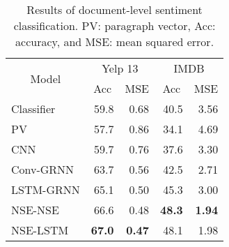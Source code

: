 \documentclass{article}
\begin{document}
\begin{table}[tp]
\begin{center}
\small
\begin{tabular}{c|c|c|c|c}
\hline
\multirow{2}{*}{Model} & \multicolumn{2}{|c|}{Yelp 13} & \multicolumn{2}{|c}{IMDB} \\
\hhline{~----} & Acc & MSE & Acc & MSE\\
\hline

\multicolumn{1}{l|}{Classifier \cite{tang:15}} & \multicolumn{1}{|r|}{59.8} & \multicolumn{1}{|r|}{0.68} & \multicolumn{1}{|r|}{40.5} & \multicolumn{1}{|r}{3.56} \\

\hline

\multicolumn{1}{l|}{PV \cite{tang:15}} & \multicolumn{1}{|r|}{57.7} & \multicolumn{1}{|r|}{0.86} & \multicolumn{1}{|r|}{34.1} & \multicolumn{1}{|r}{4.69} \\
\multicolumn{1}{l|}{CNN \cite{tang:15}} & \multicolumn{1}{|r|}{59.7} & \multicolumn{1}{|r|}{0.76} & \multicolumn{1}{|r|}{37.6} & \multicolumn{1}{|r}{3.30} \\
\multicolumn{1}{l|}{Conv-GRNN \cite{tang:15}} & \multicolumn{1}{|r|}{63.7} & \multicolumn{1}{|r|}{0.56} & \multicolumn{1}{|r|}{42.5} & \multicolumn{1}{|r}{2.71} \\
\multicolumn{1}{l|}{LSTM-GRNN \cite{tang:15}} & \multicolumn{1}{|r|}{65.1} & \multicolumn{1}{|r|}{0.50} & \multicolumn{1}{|r|}{45.3} & \multicolumn{1}{|r}{3.00} \\
\multicolumn{1}{l|}{NSE-NSE} & \multicolumn{1}{|r|}{66.6} & \multicolumn{1}{|r|}{0.48} & \multicolumn{1}{|r|}{\bf 48.3} & \multicolumn{1}{|r}{\textbf{\bf 1.94}} \\
\multicolumn{1}{l|}{NSE-LSTM} & \multicolumn{1}{|r|}{\bf 67.0} & \multicolumn{1}{|r|}{\bf 0.47} & \multicolumn{1}{|r|}{48.1} & \multicolumn{1}{|r}{1.98} \\

\hline
\end{tabular} 
\end{center}
\caption{\label{table:doc}Results of document-level sentiment classification. PV: paragraph vector, Acc: accuracy, and MSE: mean squared error.}
\end{table}
\end{document}

